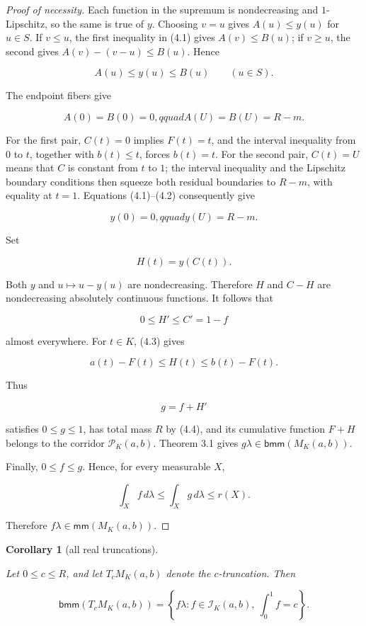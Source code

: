 \documentclass[11pt]{article}
\newtheorem{corollary}[theorem]{Corollary}
\numberwithin{equation}{section}
\begin{document}
\begin{proof}[Proof of necessity]
Each function in the supremum is nondecreasing and $1$-Lipschitz, so the same is true
of $y$. Choosing $v=u$ gives $A(u)\le y(u)$ for $u\in S$. If $v\le u$, the first
inequality in (4.1) gives $A(v)\le B(u)$; if $v\ge u$, the second gives
$A(v)-(v-u)\le B(u)$. Hence

\nopagebreak[4]
\[
A(u)\le y(u)\le B(u)\qquad(u\in S). \tag{4.3}
\]

The endpoint fibers give

\nopagebreak[4]
\[
A(0)=B(0)=0,qquad A(U)=B(U)=R-m.
\]

For the first pair, $C(t)=0$ implies $F(t)=t$, and the interval inequality from $0$ to
$t$, together with $b(t)\le t$, forces $b(t)=t$. For the second pair, $C(t)=U$ means
that $C$ is constant from $t$ to $1$; the interval inequality and the Lipschitz boundary
conditions then squeeze both residual boundaries to $R-m$, with equality at $t=1$.
Equations (4.1)--(4.2) consequently give

\nopagebreak[4]
\[
y(0)=0,qquad y(U)=R-m. \tag{4.4}
\]

Set

\nopagebreak[4]
\[
H(t)=y(C(t)).
\]

Both $y$ and $u\mapsto u-y(u)$ are nondecreasing. Therefore $H$ and $C-H$ are
nondecreasing absolutely continuous functions. It follows that

\nopagebreak[4]
\[
0\le H'\le C'=1-f
\]

almost everywhere. For $t\in K$, (4.3) gives

\nopagebreak[4]
\[
a(t)-F(t)\le H(t)\le b(t)-F(t).
\]

Thus

\nopagebreak[4]
\[
g=f+H'
\]

satisfies $0\le g\le1$, has total mass $R$ by (4.4), and its cumulative function
$F+H$ belongs to the corridor $\mathcal P_K(a,b)$. Theorem 3.1 gives
$g\lambda\in\mathsf{bmm}(M_K(a,b))$.

Finally, $0\le f\le g$. Hence, for every measurable $X$,

\nopagebreak[4]
\[
\int_X f\,d\lambda
\le\int_X g\,d\lambda
\le r(X).
\]

Therefore $f\lambda\in\mathsf{mm}(M_K(a,b))$.
\end{proof}


\begin{corollary}[all real truncations]
\label{cor:truncations}

Let $0\le c\le R$, and let $T_cM_K(a,b)$ denote the $c$-truncation. Then

\nopagebreak[4]
\[
\mathsf{bmm}(T_cM_K(a,b))
=\left\{f\lambda:
f\in\mathcal I_K(a,b),\ \int_0^1f=c
\right\}.
\]

\end{corollary}
\end{document}
